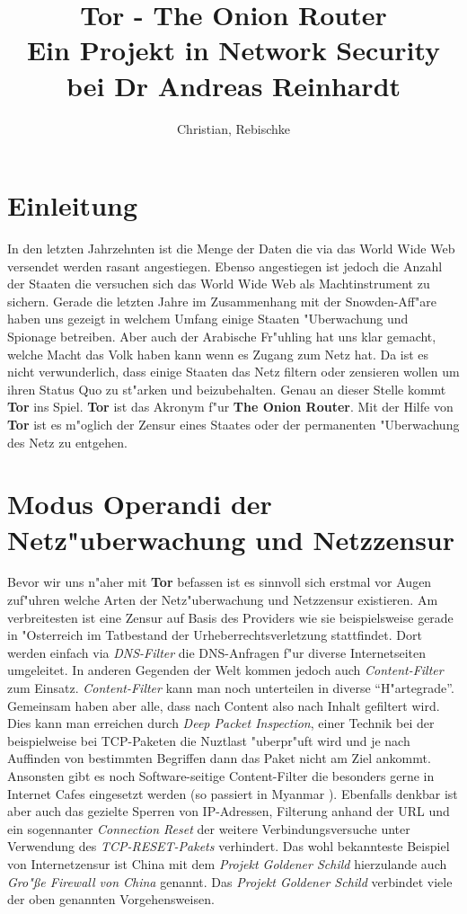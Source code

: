 \documentclass[titlepage]{article}
\title{Tor - The Onion Router \\ \large Ein Projekt in Network Security bei Dr Andreas Reinhardt}
\author{Christian, Rebischke}
\begin{document}
\maketitle
\tableofcontents
\newpage

\section{Einleitung}
In den letzten Jahrzehnten ist die Menge der Daten die via das World Wide Web versendet werden rasant angestiegen. Ebenso angestiegen ist jedoch die Anzahl der Staaten die versuchen sich das World Wide Web als Machtinstrument zu sichern. Gerade die letzten Jahre im Zusammenhang mit der Snowden-Aff"are haben uns gezeigt in welchem Umfang einige Staaten "Uberwachung und Spionage betreiben. Aber auch der Arabische Fr"uhling hat uns klar gemacht, welche Macht das Volk haben kann wenn es Zugang zum Netz hat. Da ist es nicht verwunderlich, dass einige Staaten das Netz filtern oder zensieren wollen um ihren Status Quo zu st"arken und beizubehalten. Genau an dieser Stelle kommt \textbf{Tor} ins Spiel. \textbf{Tor} ist das Akronym f"ur \textbf{The Onion Router}. Mit der Hilfe von \textbf{Tor} ist es m"oglich der Zensur eines Staates oder der permanenten "Uberwachung des Netz zu entgehen.

\section{Modus Operandi der Netz"uberwachung und Netzzensur}
Bevor wir uns n"aher mit \textbf{Tor} befassen ist es sinnvoll sich erstmal vor Augen zuf"uhren welche Arten der Netz"uberwachung und Netzzensur existieren. Am verbreitesten ist eine Zensur auf Basis des Providers wie sie beispielsweise gerade in "Osterreich im Tatbestand der Urheberrechtsverletzung stattfindet. \cite{kinox} Dort werden einfach via \textit{DNS-Filter} die DNS-Anfragen f"ur diverse Internetseiten umgeleitet. In anderen Gegenden der Welt kommen jedoch auch \textit{Content-Filter} zum Einsatz. \textit{Content-Filter} kann man noch unterteilen in diverse ``H"artegrade''. Gemeinsam haben aber alle, dass nach Content also nach Inhalt gefiltert wird. Dies kann man erreichen durch \textit{Deep Packet Inspection}, einer Technik bei der beispielweise bei TCP-Paketen die Nuztlast "uberpr"uft wird und je nach Auffinden von bestimmten Begriffen dann das Paket nicht am Ziel ankommt. Ansonsten gibt es noch Software-seitige Content-Filter die besonders gerne in Internet Cafes eingesetzt werden (so passiert in Myanmar \cite{myanmar}). Ebenfalls denkbar ist aber auch das gezielte Sperren von IP-Adressen, Filterung anhand der URL und ein sogennanter \textit{Connection Reset} der weitere Verbindungsversuche unter Verwendung des \textit{TCP-RESET-Pakets} verhindert. Das wohl bekannteste Beispiel von Internetzensur ist China mit dem \textit{Projekt Goldener Schild} hierzulande auch \textit{Gro"ße Firewall von China} genannt. Das \textit{Projekt Goldener Schild} verbindet viele der oben genannten Vorgehensweisen.
\end{document}
